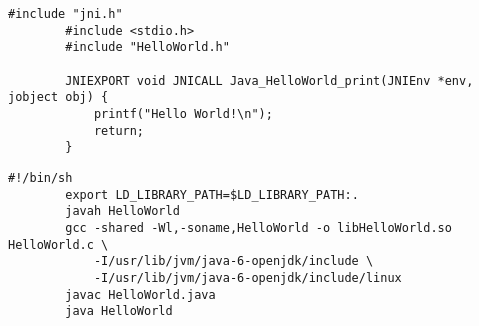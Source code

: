	\begin{lstlisting}[caption=HelloWorld.c., label=list:helloWorldC]
		#include "jni.h"
		#include <stdio.h>
		#include "HelloWorld.h"
		 
		JNIEXPORT void JNICALL Java_HelloWorld_print(JNIEnv *env, jobject obj) {
		    printf("Hello World!\n");
		    return;
		}
	\end{lstlisting}
	
	\begin{lstlisting}[caption=make.sh., label=list:make]
		#!/bin/sh
		export LD_LIBRARY_PATH=$LD_LIBRARY_PATH:.
		javah HelloWorld
		gcc -shared -Wl,-soname,HelloWorld -o libHelloWorld.so HelloWorld.c \
			-I/usr/lib/jvm/java-6-openjdk/include \
			-I/usr/lib/jvm/java-6-openjdk/include/linux
		javac HelloWorld.java
		java HelloWorld
	\end{lstlisting}
